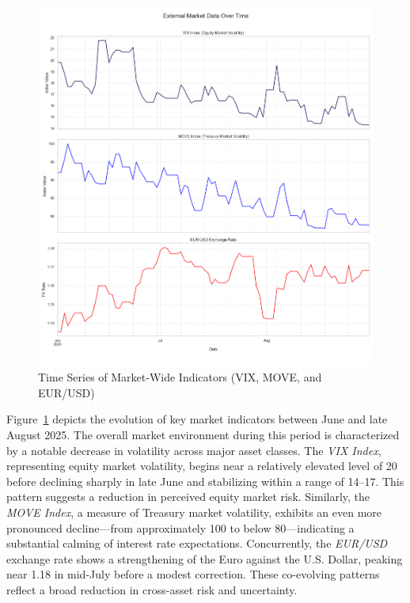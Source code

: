 \begin{figure}[H]
	\centering
	\includegraphics[width=1\textwidth]{images/descriptive_data_analysis/external_data_time_series.png}
	\caption{Time Series of Market-Wide Indicators (VIX, MOVE, and EUR/USD)}
	\label{fig:external_data_time_series}
\end{figure}

Figure~\ref{fig:external_data_time_series} depicts the evolution of key market indicators between June and late August 2025. The overall market environment during this period is characterized by a notable decrease in volatility across major asset classes. The \textit{VIX Index}, representing equity market volatility, begins near a relatively elevated level of 20 before declining sharply in late June and stabilizing within a range of 14–17. This pattern suggests a reduction in perceived equity market risk. Similarly, the \textit{MOVE Index}, a measure of Treasury market volatility, exhibits an even more pronounced decline—from approximately 100 to below 80—indicating a substantial calming of interest rate expectations. Concurrently, the \textit{EUR/USD} exchange rate shows a strengthening of the Euro against the U.S. Dollar, peaking near 1.18 in mid-July before a modest correction. These co-evolving patterns reflect a broad reduction in cross-asset risk and uncertainty.

